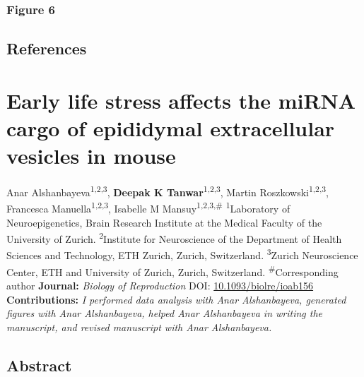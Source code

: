 \documentclass[12pt,twoside]{reedthesis}
\begin{document}
\hypertarget{figure-6}{%
\subsection{Figure 6}\label{figure-6}}

\newpage

\hypertarget{references}{%
\section{References}\label{references}}

\hypertarget{ev}{%
\chapter{Early life stress affects the miRNA cargo of epididymal extracellular vesicles in mouse}\label{ev}}

Anar Alshanbayeva\textsuperscript{1,2,3}, \textbf{Deepak K Tanwar}\textsuperscript{1,2,3}, Martin Roszkowski\textsuperscript{1,2,3}, Francesca Manuella\textsuperscript{1,2,3}, Isabelle M Mansuy\textsuperscript{1,2,3,\#}
\newline
\newline
\textsuperscript{1}Laboratory of Neuroepigenetics, Brain Research Institute at the Medical Faculty of the University of Zurich.
\newline
\textsuperscript{2}Institute for Neuroscience of the Department of Health Sciences and Technology, ETH Zurich, Zurich, Switzerland.
\newline
\textsuperscript{3}Zurich Neuroscience Center, ETH and University of Zurich, Zurich, Switzerland.
\newline
\newline
\textsuperscript{\#}Corresponding author
\newline
\newline
\textbf{Journal:} \emph{Biology of Reproduction}
\newline
DOI: \href{https://doi.org/10.1093/biolre/ioab156}{10.1093/biolre/ioab156}
\newline
\newline
\textbf{Contributions:} \emph{I performed data analysis with Anar Alshanbayeva, generated figures with Anar Alshanbayeva, helped Anar Alshanbayeva in writing the manuscript, and revised manuscript with Anar Alshanbayeva.}

\newpage

\hypertarget{abstract-1}{%
\section{Abstract}\label{abstract-1}}
\end{document}
